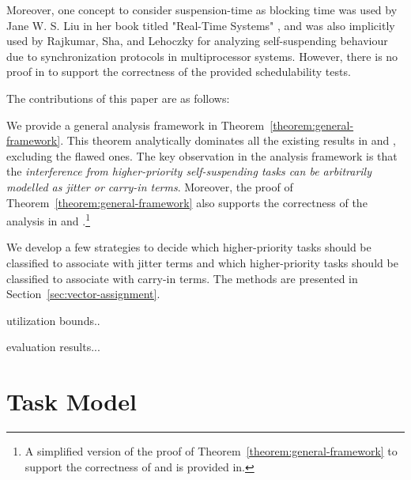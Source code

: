 \documentclass[10pt,conference,preprint]{IEEEtran}
\begin{document}
Moreover, one concept to consider suspension-time as blocking time was
used by Jane W. S. Liu in her book titled "Real-Time Systems"
\cite[Pages 164-165]{Liu:2000:RS:518501}, and was also implicitly used
by Rajkumar, Sha, and Lehoczky \cite[Page
267]{DBLP:conf/rtss/RajkumarSL88} for analyzing self-suspending
behaviour due to synchronization protocols in multiprocessor systems.
However, there is no proof in
\cite{Liu:2000:RS:518501,DBLP:conf/rtss/RajkumarSL88} to support the
correctness of the provided schedulability tests.

The contributions of this paper are as follows:
\begin{compactitem}
\item We provide a general analysis framework in
  Theorem~\ref{theorem:general-framework}. This theorem analytically
  dominates all the existing results in
  \cite{BletsasReport2015,huangpass:dac2015} and \cite[Pages
  164-165]{Liu:2000:RS:518501}, excluding the flawed ones. The key observation in the analysis
  framework is that the \emph{interference from higher-priority
    self-suspending tasks can be arbitrarily modelled as jitter or
    carry-in terms}. Moreover, the proof of
  Theorem~\ref{theorem:general-framework} also supports the
  correctness of the analysis in \cite[Pages
  164-165]{Liu:2000:RS:518501} and
  \cite[Page 267]{DBLP:conf/rtss/RajkumarSL88}.\footnote{A simplified
    version of the proof of Theorem~\ref{theorem:general-framework} to
    support the correctness of \cite[Pages
  164-165]{Liu:2000:RS:518501} and \cite[Page 267]{DBLP:conf/rtss/RajkumarSL88} is
  provided in\cite{ChenHuangNelissen}. }
\item We develop a few strategies to decide which higher-priority
  tasks should be classified to associate with jitter terms and which
  higher-priority tasks should be classified to associate with carry-in
  terms. The methods are presented in
  Section~\ref{sec:vector-assignment}.
\item utilization bounds..
\item evaluation results...
\end{compactitem}




\section{Task Model}
\end{document}
